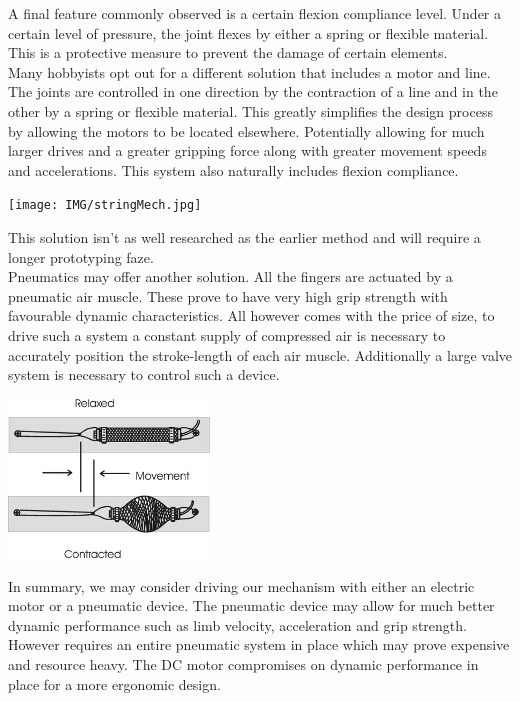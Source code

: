 \documentclass{article}
\begin{document}
A final feature commonly observed is a certain flexion compliance level. Under a certain level of pressure, the joint flexes by either a spring or flexible material. This is a protective measure to prevent the damage of certain elements.\\[12pt]
\indent Many hobbyists opt out for a different solution that includes a motor and line. The joints are controlled in one direction by the contraction of a line and in the other by a spring or flexible material. This greatly simplifies the design process by allowing the motors to be located elsewhere. Potentially allowing for much larger drives and a greater gripping force along with greater movement speeds and accelerations. This system also naturally includes flexion compliance.

\begin{center}
\texttt{[image: IMG/stringMech.jpg]}
\end{center}

This solution isn't as well researched as the earlier method and will require a longer prototyping faze. \\[12pt]
\indent Pneumatics may offer another solution. All the fingers are actuated by a pneumatic air muscle. These prove to have very high grip strength with favourable dynamic characteristics. All however comes with the price of size, to drive such a system a constant supply of compressed air is necessary to accurately position the stroke-length of each air muscle. Additionally a large valve system is necessary to control such a device.


\begin{center}
\includegraphics[width=0.4\textwidth]{IMG/airMuscle.jpg}
\end{center}
\break
In summary, we may consider driving our mechanism with either an electric motor or a pneumatic device. The pneumatic device may allow for much better dynamic performance such as limb velocity, acceleration and grip strength. However requires an entire pneumatic system in place which may prove expensive and resource heavy. The DC motor compromises on dynamic performance in place for a more ergonomic design.
\end{document}
